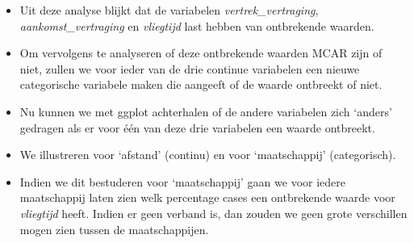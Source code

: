 \documentclass[]{tufte-book}
\newenvironment{Shaded}{}{}
\newcommand{\DataTypeTok}[1]{\textcolor[rgb]{0.56,0.13,0.00}{#1}}
\newcommand{\KeywordTok}[1]{\textcolor[rgb]{0.00,0.44,0.13}{\textbf{#1}}}
\newcommand{\NormalTok}[1]{#1}
\newcommand{\OperatorTok}[1]{\textcolor[rgb]{0.40,0.40,0.40}{#1}}
\newcommand{\StringTok}[1]{\textcolor[rgb]{0.25,0.44,0.63}{#1}}
\providecommand{\tightlist}{%
  \setlength{\itemsep}{0pt}\setlength{\parskip}{0pt}}
\begin{document}
\begin{itemize}
\tightlist
\item
  Uit deze analyse blijkt dat de variabelen \emph{vertrek\_vertraging}, \emph{aankomst\_vertraging} en \emph{vliegtijd} last hebben van ontbrekende waarden.
\item
  Om vervolgens te analyseren of deze ontbrekende waarden MCAR zijn of niet, zullen we voor ieder van de drie continue variabelen een nieuwe categorische variabele maken die aangeeft of de waarde ontbreekt of niet.
\end{itemize}

\begin{Shaded}
\end{Shaded}

\begin{itemize}
\tightlist
\item
  Nu kunnen we met ggplot achterhalen of de andere variabelen zich `anders' gedragen als er voor één van deze drie variabelen een waarde ontbreekt.
\item
  We illustreren voor `afstand' (continu) en voor `maatschappij' (categorisch).
\item
  Indien we dit bestuderen voor `maatschappij' gaan we voor iedere maatschappij laten zien welk percentage cases een ontbrekende waarde voor \emph{vliegtijd} heeft. Indien er geen verband is, dan zouden we geen grote verschillen mogen zien tussen de maatschappijen.
\end{itemize}

\begin{Shaded}
\end{Shaded}
\end{document}
